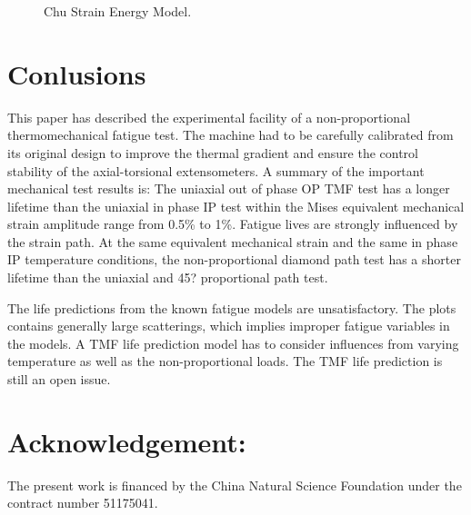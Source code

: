 \documentclass[preprint,5p,twocolumn,11pt,sort&compress]{elsarticle}
\begin{document}
\begin{figure}[!htp]
\caption{Chu Strain Energy Model.}
\label{Fig:NF-NP-TMF-Chu}
\end{figure}

\section{Conlusions}
This paper has described the experimental facility of a non-proportional thermomechanical fatigue test. The machine had to be carefully calibrated from its original design to improve the thermal gradient and ensure the control stability of the axial-torsional extensometers.
A summary of the important mechanical test results is:
The uniaxial out of phase OP TMF test has a longer lifetime than the uniaxial in phase IP test within the Mises equivalent mechanical strain amplitude range from 0.5\% to 1\%.
Fatigue lives are strongly influenced by the strain path. At the same equivalent mechanical strain and the same in phase IP temperature conditions, the non-proportional diamond path test has a shorter lifetime than the uniaxial and 45? proportional path test.

The life predictions from the known fatigue models are unsatisfactory. The plots contains generally large scatterings, which implies improper fatigue variables in the models.
A TMF life prediction model has to consider influences from varying temperature as well as the non-proportional loads. The TMF life prediction is still an open issue.






\section*{Acknowledgement:} The present work is financed by the China Natural Science Foundation under the contract number 51175041.


\end{document}
